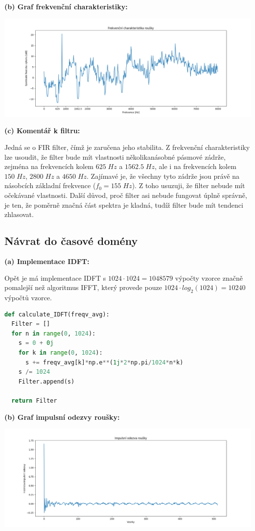 \documentclass[12pt]{article}
\begin{document}
\newpage
\textbf{(b) Graf frekvenční charakteristiky:}

\hspace{-4.5em}\includegraphics[scale=0.55]{ukol6.png}

\textbf{(c) Komentář k filtru:}

\hspace{1.5em}Jedná se o FIR filter, čímž je zaručena jeho stabilita. Z frekvenční charakteristiky lze usoudit, že filter bude mít vlastnosti několikanásobné pásmové zádrže, zejména na frekvencích kolem $625\; Hz$ a $1562.5\; Hz$, ale i na frekvencích kolem $150\; Hz$, $2800\; Hz$ a $4650\; Hz$. Zajímavé je, že všechny tyto zádrže jsou právě na násobcích základní frekvence ($f_0 = 155\; Hz$). Z toho usuzuji, že filter nebude mít očekávané vlastnosti. Další důvod, proč filter asi nebude fungovat úplně správně, je ten, že poměrně značná část spektra je kladná, tudíž filter bude mít tendenci zhlasovat.

\subsection{Návrat do časové domény}
\textbf{(a) Implementace IDFT:}

\hspace{1.5em}Opět je má implementace IDFT s $1024 \cdot 1024 = 1048579$ výpočty vzorce značně pomalejší než algoritmus IFFT, který provede pouze $1024 \cdot log_2(1024) = 10240$ výpočtů vzorce.

\begin{lstlisting}[language=Python]
def calculate_IDFT(freqv_avg):
  Filter = []
  for n in range(0, 1024):
    s = 0 + 0j
    for k in range(0, 1024):
      s += freqv_avg[k]*np.e**(1j*2*np.pi/1024*n*k)
    s /= 1024
    Filter.append(s)
    
  return Filter
\end{lstlisting}

\textbf{(b) Graf impulsní odezvy roušky:}

\hspace{-4.5em}\includegraphics[scale=0.55]{impuls_resp.png}
\end{document}
